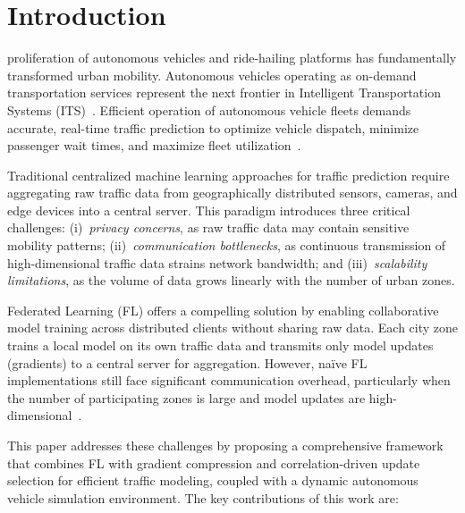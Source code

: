 \documentclass[journal]{IEEEtran}
\begin{document}
\maketitle


\section{Introduction}

 proliferation of autonomous vehicles and ride-hailing platforms has fundamentally transformed urban mobility. Autonomous vehicles operating as on-demand transportation services represent the next frontier in Intelligent Transportation Systems (ITS)~\cite{ref1}. Efficient operation of autonomous vehicle fleets demands accurate, real-time traffic prediction to optimize vehicle dispatch, minimize passenger wait times, and maximize fleet utilization~\cite{ref2}.

Traditional centralized machine learning approaches for traffic prediction require aggregating raw traffic data from geographically distributed sensors, cameras, and edge devices into a central server. This paradigm introduces three critical challenges: (i)~\textit{privacy concerns}, as raw traffic data may contain sensitive mobility patterns; (ii)~\textit{communication bottlenecks}, as continuous transmission of high-dimensional traffic data strains network bandwidth; and (iii)~\textit{scalability limitations}, as the volume of data grows linearly with the number of urban zones.

Federated Learning (FL) offers a compelling solution by enabling collaborative model training across distributed clients without sharing raw data. Each city zone trains a local model on its own traffic data and transmits only model updates (gradients) to a central server for aggregation. However, na\"ive FL implementations still face significant communication overhead, particularly when the number of participating zones is large and model updates are high-dimensional~\cite{ref4}.

This paper addresses these challenges by proposing a comprehensive framework that combines FL with gradient compression and correlation-driven update selection for efficient traffic modeling, coupled with a dynamic autonomous vehicle simulation environment. The key contributions of this work are:
\end{document}
